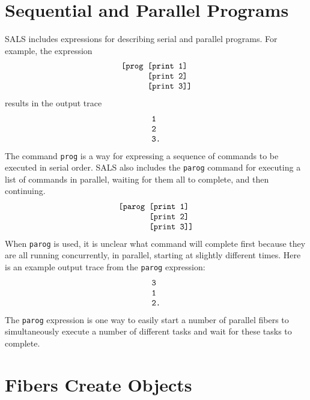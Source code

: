 \section{Sequential and Parallel Programs}

SALS includes expressions for describing serial and parallel
programs.  For example, the expression
\begin{equation*}
\begin{array}{l}
\text{\tt [prog [print 1]} \\
\text{\tt ~~~~~~[print 2]} \\
\text{\tt ~~~~~~[print 3]]}
\end{array}
\end{equation*}
results in the output trace
\begin{equation*}
\begin{array}{l}
\text{\tt 1} \\
\text{\tt 2} \\
\text{\tt 3.}
\end{array}
\end{equation*}
The command {\tt prog} is a way for expressing a sequence of commands
to be executed in serial order.  SALS also includes the {\tt parog}
command for executing a list of commands in parallel, waiting for them
all to complete, and then continuing.
\begin{equation*}
\begin{array}{l}
\text{\tt [parog [print 1]} \\
\text{\tt ~~~~~~~[print 2]} \\
\text{\tt ~~~~~~~[print 3]]}
\end{array}
\end{equation*}
When {\tt parog} is used, it is unclear what command will complete
first because they are all running concurrently, in parallel, starting
at slightly different times.  Here is an example output trace from the
{\tt parog} expression:
\begin{equation*}
\begin{array}{l}
\text{\tt 3} \\
\text{\tt 1} \\
\text{\tt 2.}
\end{array}
\end{equation*}
The {\tt parog} expression is one way to easily start a number of
parallel fibers to simultaneously execute a number of different tasks
and wait for these tasks to complete.

\section{Fibers Create Objects}

